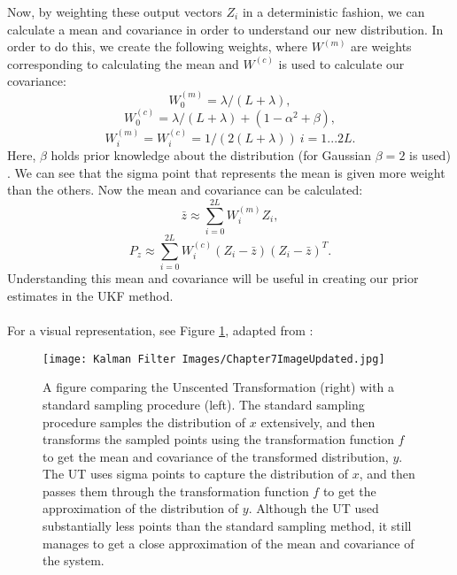 \documentclass{article}
\begin{document}
    Now, by weighting these output vectors $Z_i$ in a deterministic fashion, we can calculate a mean and covariance in order to understand our new distribution. \cite{VanMereChapter} In order to do this, we create the following weights, where $W^{(m)}$ are weights corresponding to calculating the mean and $W^{(c)}$ is used to calculate our covariance:
    \begin{equation} \label{eq:Weights_1}
    W_0^{(m)} = \lambda/(L + \lambda),
    \end{equation}
    \begin{equation} \label{eq:Weights_2}
    W_0^{(c)} = \lambda/(L + \lambda) + (1 - \alpha^2 + \beta),
    \end{equation}
    \begin{equation} \label{eq:Weights_3}
    W_i^{(m)} = W_i^{(c)} = 1/(2(L + \lambda)) \ i = 1 ... 2L.
    \end{equation}
    Here, $\beta$ holds prior knowledge about the distribution (for Gaussian $\beta = 2$ is used) \cite{VanMereChapter}. We can see that the sigma point that represents the mean is given more weight than the others. Now the mean and covariance can be calculated:
    \begin{equation}
     \bar{z} \approx \sum_{i = 0}^{2L} W_i^{(m)} Z_i,
    \end{equation}
    \begin{equation}
    P_z \approx \sum_{i = 0}^{2L} W_i^{(c)}(Z_i - \bar{z})(Z_i - \bar{z})^T.    
    \end{equation}
    Understanding this mean and covariance will be useful in creating our prior estimates in the UKF method.
    \\
    \\
    For a visual representation, see Figure \ref{fig:KF_Overview_WanMereImage}, adapted from \cite{VanMereChapter}:\\
    \begin{figure} [H]
    \centering
    \texttt{[image: Kalman Filter Images/Chapter7ImageUpdated.jpg]}
    \caption{A figure comparing the Unscented Transformation (right) with a standard sampling procedure (left). The standard sampling procedure samples the distribution of $x$ extensively, and then transforms the sampled points  using the transformation function $f$ to get the mean and covariance of the transformed distribution, $y$. The UT uses sigma points to capture the distribution of $x$, and then passes them through the transformation function $f$ to get the approximation of the distribution of $y$. Although the UT used substantially less points than the standard sampling method, it still manages to get a close approximation of the mean and covariance of the system.}
    \label{fig:KF_Overview_WanMereImage}
    \end{figure}
\end{document}

